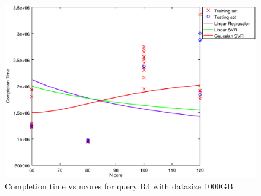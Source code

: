 
\begin {figure}[hbtp]
\centering
\includegraphics[width=\textwidth]{output/R4_1000_1_OVER_NCORES/plot_R4_1000_bestmodels.eps}
\caption{Completion time vs ncores for query R4 with datasize 1000GB}
\label{fig:all_nonlinear_R4_1000}
\end {figure}
